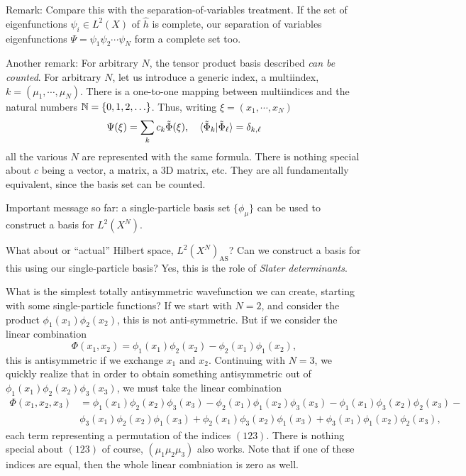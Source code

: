 \documentclass{report}
\theoremstyle{plain}
\theoremstyle{definition}
\begin{document}
Remark: Compare this with the separation-of-variables treatment. If
the set of eigenfunctions $\psi_i\in L^2(X)$ of $\hat{h}$ is complete,
our separation of variables eigenfunctions $\Psi =
\psi_1\psi_2\cdots\psi_N$ form a complete set too.

Another remark: For arbitrary $N$, the tensor product basis described
\emph{can be counted}. For arbitrary $N$, let us introduce a generic
index, a multiindex, $k = (\mu_1,\cdots,\mu_N)$. There is
a one-to-one mapping between multiindices and the natural
numbers $\mathbb{N} = \{0,1,2,\ldots\}$. Thus, writing $\xi = (x_1,\cdots,x_N)$
\begin{equation}
  \Psi(\xi) = \sum_k c_k \tilde{\Phi}(\xi), \quad
  \braket{\tilde{\Phi}_k|\tilde{\Phi}_\ell} = \delta_{k,\ell} 
\end{equation}
all the various $N$ are represented with the same formula. There is nothing
special about $c$ being a vector, a matrix, a 3D matrix, etc. They
are all fundamentally equivalent, since the basis set can be counted.

Important message so far: a single-particle basis set $\{\phi_\mu\}$
can be used to construct a basis for $L^2(X^N)$.

What about or ``actual'' Hilbert space, $L^2(X^N)_\text{AS}$? Can we
construct a basis for this using our single-particle basis? Yes, this
is the role of \emph{Slater determinants}.

What is the simplest totally antisymmetric wavefunction we can create,
starting with some single-particle functions?
If we start with $N=2$, and consider the product
$\phi_1(x_1)\phi_2(x_2)$, this is not anti-symmetric. But if we
consider the linear combination
\begin{equation}
  \Phi(x_1,x_2) = \phi_1(x_1)\phi_2(x_2) - \phi_2(x_1)\phi_1(x_2),
\end{equation}
this is antisymmetric if we exchange $x_1$ and $x_2$. Continuing with
$N=3$, we quickly realize that in order to obtain something
antisymmetric out of $\phi_1(x_1)\phi_2(x_2)\phi_3(x_3)$, we must take
the linear combination
\begin{equation}
  \begin{split}
  \Phi(x_1,x_2,x_3) &= \phi_1(x_1)\phi_2(x_2)\phi_3(x_3) -
  \phi_2(x_1)\phi_1(x_2)\phi_3(x_3) -
  \phi_1(x_1)\phi_3(x_2)\phi_2(x_3) -\\
&  \phi_3(x_1)\phi_2(x_2)\phi_1(x_3) +
  \phi_2(x_1)\phi_3(x_2)\phi_1(x_3) +
  \phi_3(x_1)\phi_1(x_2)\phi_2(x_3),
\end{split}
\end{equation}
each term representing a permutation of the indices $(123)$. There is
nothing special about $(123)$ of course, $(\mu_1\mu_2\mu_3)$ also
works. Note that if one of these indices are equal, then the whole
linear combniation is zero as well.
\end{document}
